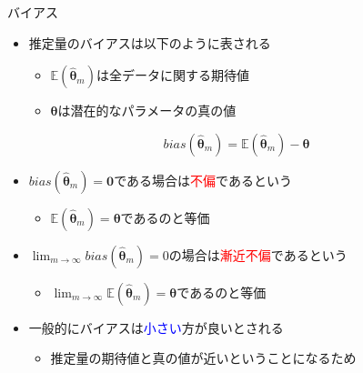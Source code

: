 \documentclass[dvipdfmx, 10pt]{beamer}
\begin{document}
\begin{frame}{バイアス}
  \begin{itemize}
    \item 推定量のバイアスは以下のように表される
    \begin{itemize}
      \item $\mathbb{E}(\hat{\bm{\theta}}_{m})$は全データに関する期待値
      \item $\bm{\theta}$は潜在的なパラメータの真の値
    \end{itemize}
  \end{itemize}
  \begin{equation}
    bias(\hat{\bm{\theta}}_{m}) = \mathbb{E}(\hat{\bm{\theta}}_{m}) - \bm{\theta}
  \end{equation}
  \begin{itemize}
    \item $bias(\hat{\bm{\theta}}_{m}) = \bm{0}$である場合は\textcolor{red}{不偏}であるという
    \begin{itemize}
      \item $\mathbb{E}(\hat{\bm{\theta}}_{m}) = \bm{\theta}$であるのと等価
    \end{itemize}
    \item $\lim_{m \to \infty} bias(\hat{\bm{\theta}}_{m}) = 0$の場合は\textcolor{red}{漸近不偏}であるという
    \begin{itemize}
      \item $\lim_{m \to \infty} \mathbb{E}(\hat{\bm{\theta}}_{m}) = \bm{\theta}$であるのと等価
    \end{itemize}
    \item 一般的にバイアスは\textcolor{blue}{小さい}方が良いとされる
    \begin{itemize}
      \item 推定量の期待値と真の値が近いということになるため
    \end{itemize}
  \end{itemize}
\end{frame}

\end{document}

